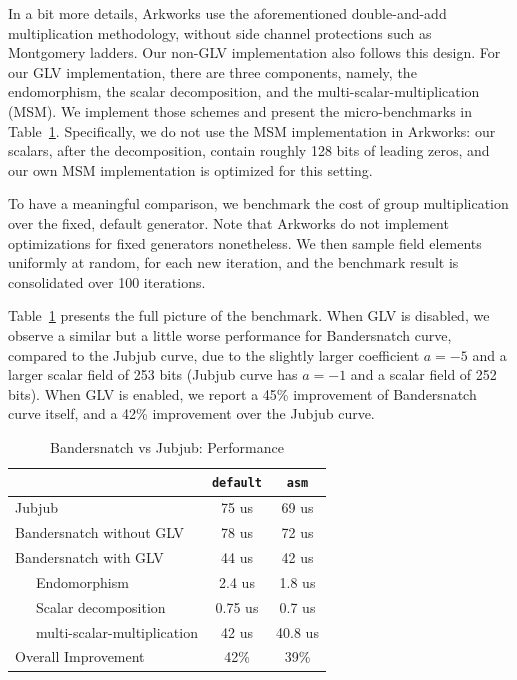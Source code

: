 \documentclass{article}
\theoremstyle{definition}
\begin{document}
In a bit more details, Arkworks use the aforementioned
double-and-add
multiplication methodology, without side channel protections such 
as Montgomery ladders. Our non-GLV implementation also follows
this design. For our GLV implementation, there are three components,
namely, the endomorphism, the scalar decomposition, and the
multi-scalar-multiplication (MSM). We implement those schemes and 
present the micro-benchmarks in Table~\ref{tab:comp_full}.
Specifically, we do not use the MSM implementation in Arkworks:
our scalars, after the decomposition, contain roughly 128 bits
of leading zeros, and our own MSM implementation is 
optimized for this setting.

To have a meaningful comparison, we benchmark
the cost of group multiplication over the fixed, default generator.
Note that Arkworks do not implement optimizations for 
fixed generators nonetheless. We then sample field elements 
uniformly at random, for each new iteration, and the benchmark
result is consolidated over 100 iterations.

Table~\ref{tab:comp_full} presents the full picture of the benchmark.
When GLV is disabled, we observe a similar but a little worse 
performance for Bandersnatch curve, compared to
the Jubjub curve, due to the slightly larger coefficient 
$a=-5$ and a larger scalar field of 253 bits (Jubjub curve has $a=-1$
and a scalar field of 252 bits).
When GLV is enabled, we report a 45\% improvement of Bandersnatch curve
itself, and a 42\% improvement over the Jubjub curve.

\begin{table}[ht] %
  \centering
  
  \begin{tabular}{|l|c|c|}\hline
      & \texttt{default} & \texttt{asm}\\\hline\hline
    Jubjub & 75 us & 69 us \\\hline\hline
    Bandersnatch without GLV & 78 us & 72 us  \\\hline\hline   
    Bandersnatch with GLV& 44 us & 42 us \\\hline
    \ \ \ Endomorphism & 2.4 us& 1.8 us\\\hline
    \ \ \ Scalar decomposition & 0.75 us & 0.7 us \\\hline
    \ \ \ multi-scalar-multiplication & 42 us &  40.8 us\\\hline\hline
    Overall Improvement & 42\% & 39\% \\\hline
  \end{tabular}
  \caption{Bandersnatch vs Jubjub: Performance}
  \label{tab:comp_full}
\end{table}
\end{document}
